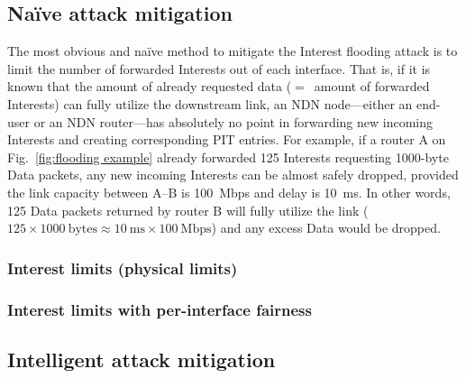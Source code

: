 \subsection{Na\"{i}ve attack mitigation}



The most obvious and na\"{i}ve method to mitigate the Interest flooding attack is to limit the number of forwarded Interests out of each interface. 
That is, if it is known that the amount of already requested data ($=$~amount of forwarded Interests) can fully utilize the downstream link, an NDN node---either an end-user or an NDN router---has absolutely no point in forwarding new incoming Interests and creating corresponding PIT entries.
For example, if a router A on Fig.~\ref{fig:flooding example} already forwarded 125 Interests requesting 1000-byte Data packets, any new incoming Interests can be almost safely dropped, provided the link capacity between A--B is 100~Mbps and delay is 10~ms.
In other words, 125 Data packets returned by router B will fully utilize the link ($125 \times 1000 \mathrm{~bytes} \approx 10\mathrm{~ms} \times 100\mathrm{~Mbps}$) and any excess Data would be dropped.

\subsubsection{Interest limits (physical limits)}
\label{sec:physical limits}




\subsubsection{Interest limits with per-interface fairness}
\label{sec:queuing}




\subsection{Intelligent attack mitigation}

